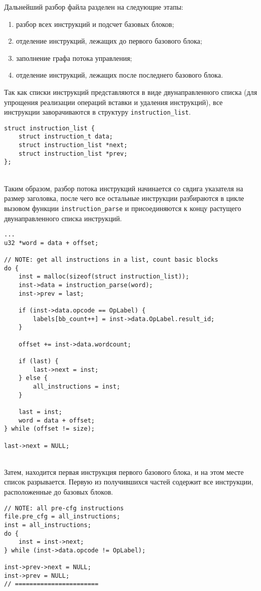 \documentclass[14pt]{extarticle}
\begin{document}
Дальнейший разбор файла разделен на следующие этапы:
\begin{enumerate}
	\item разбор всех инструкций и подсчет базовых блоков;
	\item отделение инструкций, лежащих до первого базового блока;
	\item заполнение графа потока управления;
	\item отделение инструкций, лежащих после последнего базового блока.
\end{enumerate}

Так как списки инструкций представляются в виде двунаправленного списка (для упрощения реализации операций вставки и удаления инструкций), все инструкции заворачиваются в структуру \texttt{instruction\_list}.
\begin{lstlisting}[caption={элемент двунаправленного списка инструкций}]
struct instruction_list {
    struct instruction_t data;
    struct instruction_list *next;
    struct instruction_list *prev;
};
\end{lstlisting}
~\\ %

Таким образом, разбор потока инструкций начинается со свдига указателя на размер заголовка, после чего все остальные инструкции разбираются в цикле вызовом функции \texttt{instruction\_parse} и присоединяются к концу растущего двунаправленного списка инструкций.
\begin{lstlisting}[caption={составление полного списка инструкций}]
...
u32 *word = data + offset;
    
// NOTE: get all instructions in a list, count basic blocks
do {
    inst = malloc(sizeof(struct instruction_list));
    inst->data = instruction_parse(word);
    inst->prev = last;

    if (inst->data.opcode == OpLabel) {
        labels[bb_count++] = inst->data.OpLabel.result_id;
    }

    offset += inst->data.wordcount;
  
    if (last) {
        last->next = inst;
    } else {
        all_instructions = inst;
    }

    last = inst;
    word = data + offset;
} while (offset != size);
    
last->next = NULL;
\end{lstlisting}
~\\ %

Затем, находится первая инструкция первого базового блока, и на этом месте список разрывается. Первую из получившихся частей содержит все инструкции, расположенные до базовых блоков.
\begin{lstlisting}[caption={отделение инструкций, расположенных до базовых блоков}]
// NOTE: all pre-cfg instructions
file.pre_cfg = all_instructions;
inst = all_instructions;
do {
    inst = inst->next;
} while (inst->data.opcode != OpLabel);
   
inst->prev->next = NULL;
inst->prev = NULL;
// =======================
\end{lstlisting}
~\\ %
\end{document}
